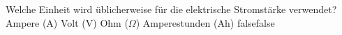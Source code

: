     {Welche Einheit wird üblicherweise für die elektrische Stromstärke verwendet?}
    {Ampere (A)}
    {Volt (V)}
    {Ohm ($\Omega$)}
    {Amperestunden (Ah)}
    {false}{false}